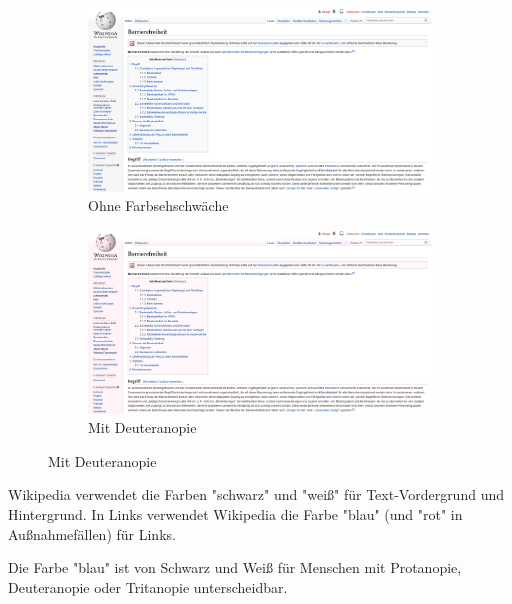 \documentclass[a4paper,12pt]{article}
\begin{document}
\begin{enumerate}[label=\alph*)]
        \begin{figure}[h]
          \centering
          \begin{subfigure}[b]{0.4\textwidth}
            \includegraphics[width=\textwidth]{./2023-05-14-screenshot-without-cvd-wikipedia.png}
            \caption{Ohne Farbsehschwäche}
            \label{fig:without-cvd-wikipedia}
          \end{subfigure}
          \begin{subfigure}[b]{0.4\textwidth}
            \includegraphics[width=\textwidth]{./2023-05-14-screenshot-with-cvd-wikipedia.png}
            \caption{Mit Deuteranopie}
            \label{fig:with-cvd-wikipedia}
          \end{subfigure}
        \end{figure}

        Wikipedia verwendet die Farben "schwarz" und "weiß" für Text-Vordergrund und Hintergrund.
        In Links verwendet Wikipedia die Farbe "blau" (und "rot" in Außnahmefällen) für Links.

        Die Farbe "blau" ist von Schwarz und Weiß für Menschen mit Protanopie, Deuteranopie oder Tritanopie unterscheidbar.
\end{enumerate}
\end{document}
